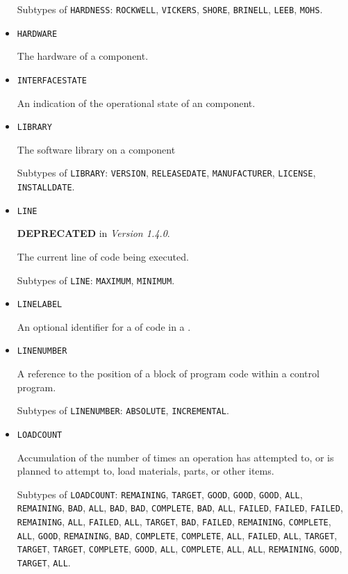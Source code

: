\begin{itemize}
Subtypes of \texttt{HARDNESS}: \texttt{ROCKWELL}, \texttt{VICKERS}, \texttt{SHORE}, \texttt{BRINELL}, \texttt{LEEB}, \texttt{MOHS}.

\item \texttt{HARDWARE}  

The hardware of a component.



\item \texttt{INTERFACE\textunderscore STATE}  

An indication of the operational state of an  component.


\item \texttt{LIBRARY}  

The software library on a component

Subtypes of \texttt{LIBRARY}: \texttt{VERSION}, \texttt{RELEASE\textunderscore DATE}, \texttt{MANUFACTURER}, \texttt{LICENSE}, \texttt{INSTALL\textunderscore DATE}.

\item \texttt{LINE}  

\textbf{DEPRECATED} in \textit{Version 1.4.0}.

The current line of code being executed.

Subtypes of \texttt{LINE}: \texttt{MAXIMUM}, \texttt{MINIMUM}.

\item \texttt{LINE\textunderscore LABEL}  

An optional identifier for a  of code in a .


\item \texttt{LINE\textunderscore NUMBER}  

A reference to the position of a block of program code within a control program.

Subtypes of \texttt{LINE\textunderscore NUMBER}: \texttt{ABSOLUTE}, \texttt{INCREMENTAL}.

\item \texttt{LOAD\textunderscore COUNT}  

Accumulation of the number of times an operation has attempted to, or is planned to attempt to, load materials, parts, or other items.

Subtypes of \texttt{LOAD\textunderscore COUNT}: \texttt{REMAINING}, \texttt{TARGET}, \texttt{GOOD}, \texttt{GOOD}, \texttt{GOOD}, \texttt{ALL}, \texttt{REMAINING}, \texttt{BAD}, \texttt{ALL}, \texttt{BAD}, \texttt{BAD}, \texttt{COMPLETE}, \texttt{BAD}, \texttt{ALL}, \texttt{FAILED}, \texttt{FAILED}, \texttt{FAILED}, \texttt{REMAINING}, \texttt{ALL}, \texttt{FAILED}, \texttt{ALL}, \texttt{TARGET}, \texttt{BAD}, \texttt{FAILED}, \texttt{REMAINING}, \texttt{COMPLETE}, \texttt{ALL}, \texttt{GOOD}, \texttt{REMAINING}, \texttt{BAD}, \texttt{COMPLETE}, \texttt{COMPLETE}, \texttt{ALL}, \texttt{FAILED}, \texttt{ALL}, \texttt{TARGET}, \texttt{TARGET}, \texttt{TARGET}, \texttt{COMPLETE}, \texttt{GOOD}, \texttt{ALL}, \texttt{COMPLETE}, \texttt{ALL}, \texttt{ALL}, \texttt{REMAINING}, \texttt{GOOD}, \texttt{TARGET}, \texttt{ALL}.


\end{itemize}
